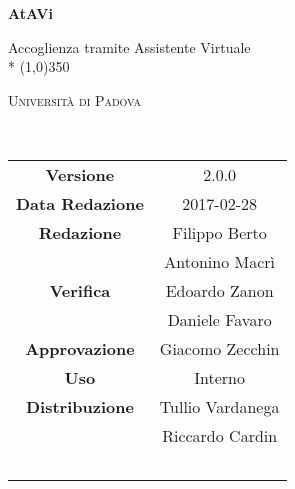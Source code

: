 \documentclass[a4paper,12pt]{article}
\date{aaaa/mm/gg}
\begin{document}
\begin{titlepage}
	\centering
	{\huge\bfseries AtAVi\par}
	Accoglienza tramite Assistente Virtuale \\*
	\line(1,0){350} \\
	{\scshape\LARGE Università di Padova \par}
	\vspace{1cm}
	{\scshape\Large \normediprogettoi\ \par}
	\logo
	\newpage
	\begin{tabular}{c|c}
		{\hfill \textbf{Versione}} 			& 2.0.0								\\
		{\hfill\textbf{Data Redazione}} 	& 2017-02-28 						\\
		{\hfill\textbf{Redazione}} 			& Filippo Berto \\ & Antonino Macrì \\
		{\hfill\textbf{Verifica}} 			& Edoardo Zanon\\ & Daniele Favaro				\\
		{\hfill\textbf{Approvazione}} 		& Giacomo Zecchin					\\
		{\hfill\textbf{Uso}} 				& Interno 							\\
		{\hfill\textbf{Distribuzione}} 		& Tullio Vardanega \\ & Riccardo Cardin \\ & \prop\	\\
	\end{tabular}
\end{titlepage}
	
	\pagestyle{myfront}
	\newpage
		
	\newpage
		\tableofcontents
	
	\label{LastFrontPage}	
		\newpage	
		\pagestyle{mymain}		
			
		\newpage
			
		\newpage
			
		\newpage		
			
		\newpage		
			
		\newpage		
			
		\newpage		
			
		
	\label{LastPage}
\end{document}
